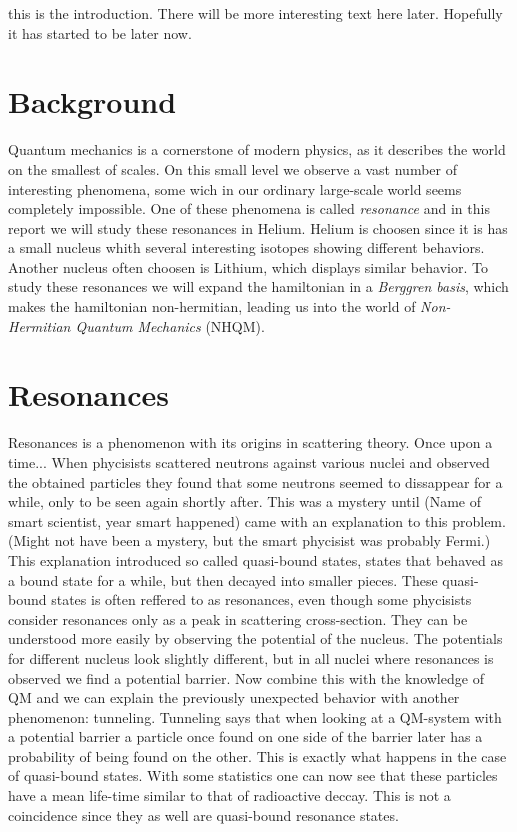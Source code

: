 this is the introduction. There will be more interesting text here later. Hopefully it has started to be later now.

\section{Background}
Quantum mechanics is a cornerstone of modern physics, as it describes the world on the smallest of scales.
On this small level we observe a vast number of interesting phenomena, some wich in our ordinary large-scale world seems completely impossible.
One of these phenomena is called \emph{resonance} and in this report we will study these resonances in Helium.
Helium is choosen since it is has a small nucleus whith several interesting isotopes showing different behaviors.
Another nucleus often choosen is Lithium, which displays similar behavior.
To study these resonances we will expand the hamiltonian in a \emph{Berggren basis}, which makes the hamiltonian non-hermitian, leading us into the world of \emph{Non-Hermitian Quantum Mechanics} (NHQM).


\section{Resonances}
Resonances is a phenomenon with its origins in scattering theory.
Once upon a time... When phycisists scattered neutrons against various nuclei and observed the obtained particles they found that some neutrons seemed to dissappear for a while, only to be seen again shortly after.
This was a mystery until (Name of smart scientist, year smart happened) came with an explanation to this problem. (Might not have been a mystery, but the smart phycisist was probably Fermi.)
This explanation introduced so called quasi-bound states, states that behaved as a bound state for a while, but then decayed into smaller pieces.
These quasi-bound states is often reffered to as resonances, even though some phycisists consider resonances only as a peak in scattering cross-section.
They can be understood more easily by observing the potential of the nucleus.
The potentials for different nucleus look slightly different, but in all nuclei where resonances is observed we find a potential barrier.
Now combine this with the knowledge of QM and we can explain the previously unexpected behavior with another phenomenon: tunneling.
Tunneling says that when looking at a QM-system with a potential barrier a particle once found on one side of the barrier later has a probability of being found on the other.
This is exactly what happens in the case of quasi-bound states.
With some statistics one can now see that these particles have a mean life-time similar to that of radioactive deccay.
This is not a coincidence since they as well are quasi-bound resonance states.

